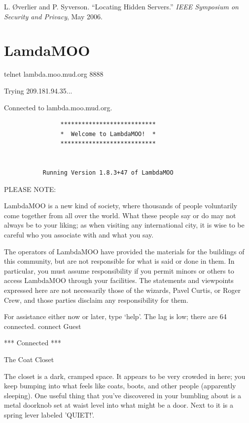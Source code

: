 \documentclass[10pt,twoside,openany]{memoir}
\begin{document}
\vskip 0.2in 

\noindent L. {\O}verlier and P. Syverson. ``Locating Hidden Servers.'' \textit{IEEE Symposium on Security and Privacy}, May 2006.


\chapter{LamdaMOO}

{\footnotesize
\ttfamily
\parindent0pt
\parskip6pt
telnet lambda.moo.mud.org 8888

Trying 209.181.94.35...

Connected to lambda.moo.mud.org.

\begin{verbatim}
                ***************************
                *  Welcome to LambdaMOO!  *
                ***************************


           Running Version 1.8.3+47 of LambdaMOO
\end{verbatim}

PLEASE NOTE:

LambdaMOO is a new kind of society, where thousands of people voluntarily
come together from all over the world.  What these people say or do may not
always be to your liking; as when visiting any international city, it is wise
to be careful who you associate with and what you say.

The operators of LambdaMOO have provided the materials for the buildings of
this community, but are not responsible for what is said or done in them.  In
particular, you must assume responsibility if you permit minors or others to
access LambdaMOO through your facilities.  The statements and viewpoints
expressed here are not necessarily those of the wizards, Pavel Curtis,
or Roger Crew, and those parties disclaim any responsibility for them.

For assistance either now or later, type `help'.
The lag is low; there are 64 connected.
connect Guest

*** Connected ***

The Coat Closet

The closet is a dark, cramped space.  It appears  to be very crowded in here; you keep bumping into what feels like coats,  boots, and other people (apparently sleeping).  One useful thing that you've  discovered in your bumbling about is a metal doorknob set at waist level into  what might be a door.  Next to it is a spring lever labeled 'QUIET!'.

}
\end{document}
